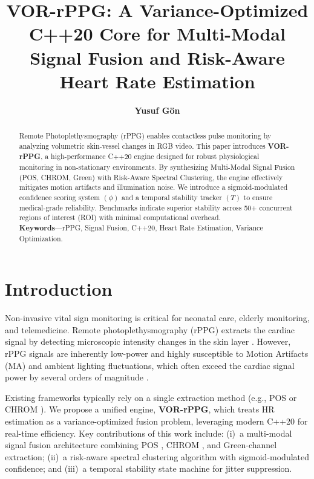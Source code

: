 \documentclass[9pt,technote,twocolumn,compsoc]{article}
\title{\vspace{-1cm}\huge \textbf{VOR-rPPG: A Variance-Optimized C++20 Core for Multi-Modal Signal Fusion and Risk-Aware Heart Rate Estimation}}
\author{\textbf{Yusuf G\"on}}
\affil{\textit{Eskisehir Sabiha Gokcen Mesleki ve Teknik Anadolu Lisesi, Turkey. Email: gunes41yy@gmail.com}}
\affil{\scriptsize ORCID: 0009-0004-9430-8114}
\date{}
\begin{document}
\maketitle

\begin{abstract}
Remote Photoplethysmography (rPPG) enables contactless pulse monitoring by analyzing volumetric skin-vessel changes in RGB video. This paper introduces \textbf{VOR-rPPG}, a high-performance C++20 engine designed for robust physiological monitoring in non-stationary environments. By synthesizing Multi-Modal Signal Fusion (POS, CHROM, Green) with Risk-Aware Spectral Clustering, the engine effectively mitigates motion artifacts and illumination noise. We introduce a sigmoid-modulated confidence scoring system $(\phi)$ and a temporal stability tracker $(T)$ to ensure medical-grade reliability. Benchmarks indicate superior stability across 50+ concurrent regions of interest (ROI) with minimal computational overhead.
\\[0.2cm]
\textbf{Keywords}---rPPG, Signal Fusion, C++20, Heart Rate Estimation, Variance Optimization.
\end{abstract}

\section{Introduction}
Non-invasive vital sign monitoring is critical for neonatal care, elderly monitoring, and telemedicine. Remote photoplethysmography (rPPG) extracts the cardiac signal by detecting microscopic intensity changes in the skin layer \cite{verkruysse2008}. However, rPPG signals are inherently low-power and highly susceptible to Motion Artifacts (MA) and ambient lighting fluctuations, which often exceed the cardiac signal power by several orders of magnitude \cite{wang2017}. 

Existing frameworks typically rely on a single extraction method (e.g., POS or CHROM \cite{haan2013}). We propose a unified engine, \textbf{VOR-rPPG}, which treats HR estimation as a variance-optimized fusion problem, leveraging modern C++20 for real-time efficiency. Key contributions of this work include: (i)~a multi-modal signal fusion architecture combining POS \cite{wang2017}, CHROM \cite{haan2013}, and Green-channel extraction; (ii)~a risk-aware spectral clustering algorithm with sigmoid-modulated confidence; and (iii)~a temporal stability state machine for jitter suppression.
\end{document}
